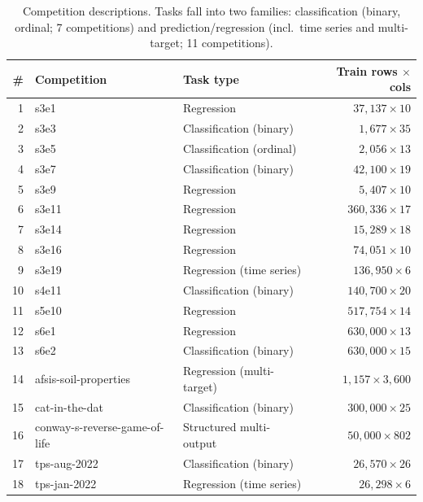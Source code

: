 \documentclass[11pt,a4paper]{article}
\begin{document}
\begin{table}[htbp]
\centering\small
\caption{Competition descriptions. Tasks fall into two families: classification (binary, ordinal; 7 competitions) and prediction/regression (incl.\ time series and multi-target; 11 competitions).}
\label{tab:comps}
\begin{tabular}{@{}rllr@{}}
\toprule
\# & \textbf{Competition} & \textbf{Task type} & \textbf{Train rows $\times$ cols} \\
\midrule
1 & s3e1 & Regression & $37{,}137 \times 10$ \\
2 & s3e3 & Classification (binary) & $1{,}677 \times 35$ \\
3 & s3e5 & Classification (ordinal) & $2{,}056 \times 13$ \\
4 & s3e7 & Classification (binary) & $42{,}100 \times 19$ \\
5 & s3e9 & Regression & $5{,}407 \times 10$ \\
6 & s3e11 & Regression & $360{,}336 \times 17$ \\
7 & s3e14 & Regression & $15{,}289 \times 18$ \\
8 & s3e16 & Regression & $74{,}051 \times 10$ \\
9 & s3e19 & Regression (time series) & $136{,}950 \times 6$ \\
10 & s4e11 & Classification (binary) & $140{,}700 \times 20$ \\
11 & s5e10 & Regression & $517{,}754 \times 14$ \\
12 & s6e1 & Regression & $630{,}000 \times 13$ \\
13 & s6e2 & Classification (binary) & $630{,}000 \times 15$ \\
14 & afsis-soil-properties & Regression (multi-target) & $1{,}157 \times 3{,}600$ \\
15 & cat-in-the-dat & Classification (binary) & $300{,}000 \times 25$ \\
16 & conway-s-reverse-game-of-life & Structured multi-output & $50{,}000 \times 802$ \\
17 & tps-aug-2022 & Classification (binary) & $26{,}570 \times 26$ \\
18 & tps-jan-2022 & Regression (time series) & $26{,}298 \times 6$ \\
\bottomrule
\end{tabular}
\end{table}
\end{document}
